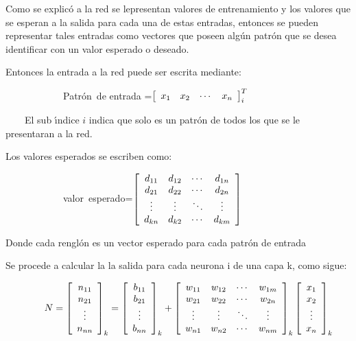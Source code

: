 Como se explic\'{o} a la red se lepresentan valores de entrenamiento y los
valores que se esperan a la salida para cada una de estas entradas, entonces
se pueden representar tales entradas como vectores que poseen alg\'{u}n
patr\'{o}n que se desea identificar con un valor esperado o deseado.

Entonces la entrada a la red puede ser escrita mediante:

$\qquad\qquad\qquad$Patr\'{o}n\ de entrada =$\left[
\begin{array}
[c]{cccc}%
x_{1} & x_{2} & \cdots & x_{n}%
\end{array}
\right]  _{i}^{T}$

\ \ \ \ El sub \'{\i}ndice $i$ indica que solo es un patr\'{o}n de todos los
que se le presentaran a la red.

Los valores esperados se escriben como:

\bigskip$\qquad\qquad\qquad$valor\ esperado=$\left[
\begin{array}
[c]{cccc}%
d_{11} & d_{12} & \cdots & d_{1n}\\
d_{21} & d_{22} & \cdots & d_{2n}\\
\vdots & \vdots & \ddots & \vdots\\
d_{kn} & d_{k2} & \cdots & d_{km}%
\end{array}
\right]  $

Donde cada rengl\'{o}n es un vector esperado para cada patr\'{o}n de entrada

\bigskip

Se procede a calcular la la salida para cada neurona i de \bigskip una capa k,
como sigue:

\bigskip$\qquad\qquad N=\left[
\begin{array}
[c]{c}%
n_{11}\\
n_{21}\\
\vdots\\
n_{nn}%
\end{array}
\right]  _{k}=\left[
\begin{array}
[c]{c}%
b_{11}\\
b_{21}\\
\vdots\\
b_{nn}%
\end{array}
\right]  _{k}+\left[
\begin{array}
[c]{cccc}%
w_{11} & w_{12} & \cdots & w_{1m}\\
w_{21} & w_{22} & \cdots & w_{2n}\\
\vdots & \vdots & \ddots & \vdots\\
w_{n1} & w_{n2} & \cdots & w_{nm}%
\end{array}
\right]  _{k}\left[
\begin{array}
[c]{c}%
x_{1}\\
x_{2}\\
\vdots\\
x_{n}%
\end{array}
\right]  _{k}$

